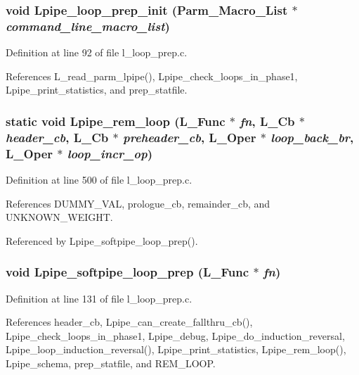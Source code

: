 \subsubsection{\setlength{\rightskip}{0pt plus 5cm}void Lpipe\_\-loop\_\-prep\_\-init (Parm\_\-Macro\_\-List $\ast$ {\em command\_\-line\_\-macro\_\-list})}\label{l__loop__prep_8c_4eeb6fd3ff13b6090f380c27cd9c03f1}




Definition at line 92 of file l\_\-loop\_\-prep.c.

References L\_\-read\_\-parm\_\-lpipe(), Lpipe\_\-check\_\-loops\_\-in\_\-phase1, Lpipe\_\-print\_\-statistics, and prep\_\-statfile.
\subsubsection{\setlength{\rightskip}{0pt plus 5cm}static void Lpipe\_\-rem\_\-loop (L\_\-Func $\ast$ {\em fn}, L\_\-Cb $\ast$ {\em header\_\-cb}, L\_\-Cb $\ast$ {\em preheader\_\-cb}, L\_\-Oper $\ast$ {\em loop\_\-back\_\-br}, L\_\-Oper $\ast$ {\em loop\_\-incr\_\-op})\hspace{0.3cm}{\tt  [static]}}\label{l__loop__prep_8c_2f87543f0c44feedf9c4085fb0037d22}




Definition at line 500 of file l\_\-loop\_\-prep.c.

References DUMMY\_\-VAL, prologue\_\-cb, remainder\_\-cb, and UNKNOWN\_\-WEIGHT.

Referenced by Lpipe\_\-softpipe\_\-loop\_\-prep().
\subsubsection{\setlength{\rightskip}{0pt plus 5cm}void Lpipe\_\-softpipe\_\-loop\_\-prep (L\_\-Func $\ast$ {\em fn})}\label{l__loop__prep_8c_a7825f4c4240ff3b4d94ad59e278cda3}




Definition at line 131 of file l\_\-loop\_\-prep.c.

References header\_\-cb, Lpipe\_\-can\_\-create\_\-fallthru\_\-cb(), Lpipe\_\-check\_\-loops\_\-in\_\-phase1, Lpipe\_\-debug, Lpipe\_\-do\_\-induction\_\-reversal, Lpipe\_\-loop\_\-induction\_\-reversal(), Lpipe\_\-print\_\-statistics, Lpipe\_\-rem\_\-loop(), Lpipe\_\-schema, prep\_\-statfile, and REM\_\-LOOP.

